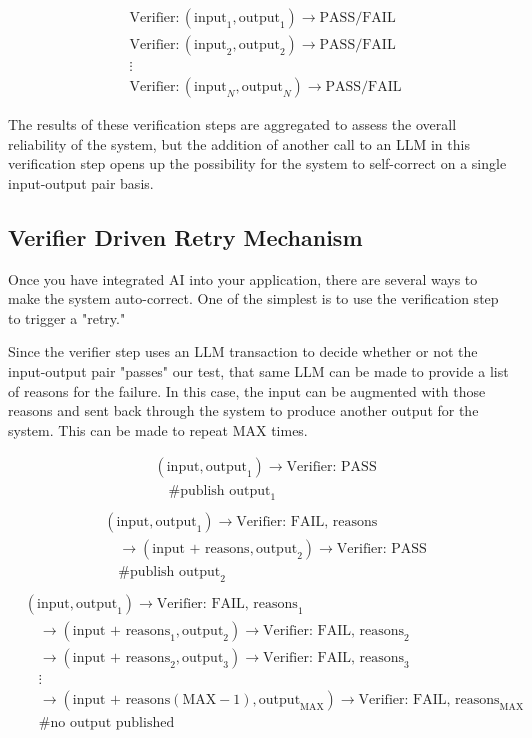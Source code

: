 \documentclass{article}
\begin{document}
\begin{equation*}
\begin{aligned}
&\text{Verifier}: (\text{input}_1,  \text{output}_1) \rightarrow \text{PASS/FAIL} \\
&\text{Verifier}: (\text{input}_2,  \text{output}_2) \rightarrow \text{PASS/FAIL} \\
&\vdots \\
&\text{Verifier}: (\text{input}_N,  \text{output}_N) \rightarrow \text{PASS/FAIL}
\end{aligned}
\end{equation*}

The results of these verification steps are aggregated to assess the overall reliability of the system, but the addition of another call to an LLM in this verification step opens up the possibility for the system to self-correct on a single input-output pair basis.

\subsection{Verifier Driven Retry Mechanism}

Once you have integrated AI into your application, there are several ways to make the system auto-correct. One of the simplest is to use the verification step to trigger a "retry."

Since the verifier step uses an LLM transaction to decide whether or not the input-output pair "passes" our test, that same LLM can be made to provide a list of reasons for the failure. In this case, the input can be augmented with those reasons and sent back through the system to produce another output for the system. This can be made to repeat \( \text{MAX} \) times.

\begin{align*}
&(\text{input}, \text{output}_1) \rightarrow \text{Verifier: PASS} \\
&\quad \text{\# publish output}_1 \\
\end{align*}
\begin{align*}
&(\text{input}, \text{output}_1) \rightarrow \text{Verifier: FAIL, reasons} \\
&\quad \rightarrow (\text{input + reasons}, \text{output}_2) \rightarrow \text{Verifier: PASS} \\
&\quad \text{\# publish output}_2 \\
\end{align*}
\begin{align*}
&(\text{input}, \text{output}_1) \rightarrow \text{Verifier: FAIL, reasons}_1 \\
&\quad \rightarrow (\text{input + reasons}_1, \text{output}_2) \rightarrow \text{Verifier: FAIL, reasons}_2 \\
&\quad \rightarrow (\text{input + reasons}_2, \text{output}_3) \rightarrow \text{Verifier: FAIL, reasons}_3 \\
&\quad \vdots \\
&\quad \rightarrow (\text{input + reasons}(\text{MAX}-1), \text{output}_\text{MAX}) \rightarrow \text{Verifier: FAIL, reasons}_\text{MAX} \\
&\quad \text{\# no output published}
\end{align*}
\end{document}
